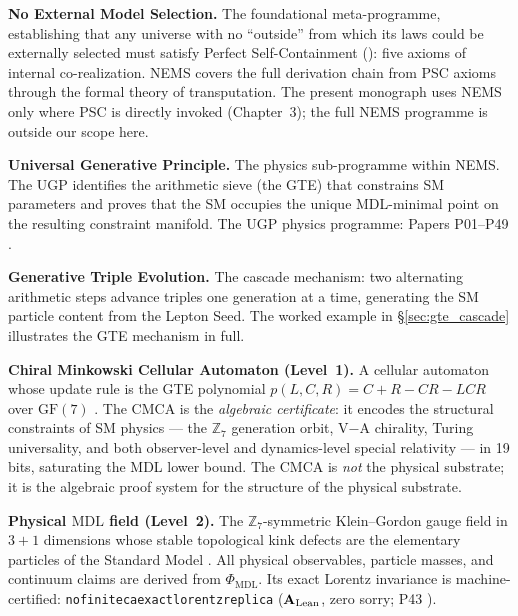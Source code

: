 \documentclass[11pt,openany]{book}
\theoremstyle{remark}
\newcommand{\UGP}{\text{UGP}}
\newcommand{\GTE}{\text{GTE}}
\newcommand{\MDL}{\text{MDL}}
\newcommand{\PSC}{\text{PSC}}
\newcommand{\NEMS}{\text{NEMS}}
\newcommand{\PHIMDL}{\Phi_{\mathrm{MDL}}}
\newcommand{\lean}[1]{%
  \penalty-100
  \begingroup\def\_{\textunderscore\allowbreak}\texttt{#1}\endgroup}
\newcommand{\CMCA}{\text{CMCA}}
\newcommand{\poly}{p(L,C,R)}
\newcommand{\CatAL}{\ensuremath{\textbf{A}_{\rm Lean}}}
\begin{document}
\begin{description}[leftmargin=2.4cm,labelwidth=2.2cm,itemsep=8pt]
\item[\NEMS] \textbf{No External Model Selection.}
  The foundational meta-programme, establishing that any universe with no ``outside''
  from which its laws could be externally selected must satisfy Perfect Self-Containment
  (\PSC): five axioms of internal co-realization.
  NEMS covers the full derivation chain from PSC axioms through the formal theory of
  transputation.
  The present monograph uses NEMS only where PSC is directly invoked
  (Chapter~3); the full NEMS programme is outside our scope here.

\item[\UGP] \textbf{Universal Generative Principle.}
  The physics sub-programme within NEMS.
  The UGP identifies the arithmetic sieve (the GTE) that constrains SM parameters
  and proves that the SM occupies the unique MDL-minimal point on the resulting
  constraint manifold.
  The UGP physics programme: Papers P01--P49 \cite{SpivackUGPSurvey}.

\item[\GTE] \textbf{Generative Triple Evolution.}
  The cascade mechanism: two alternating arithmetic steps advance triples one
  generation at a time, generating the SM particle content from the Lepton Seed.
  The worked example in \S\ref{sec:gte_cascade} illustrates the GTE mechanism in full.

\item[\CMCA] \textbf{Chiral Minkowski Cellular Automaton (Level~1).}
  A cellular automaton whose update rule is the GTE polynomial
  $\poly = C + R - CR - LCR$ over $\mathrm{GF}(7)$
  \cite{SpivackCMCA}.
  The CMCA is the \emph{algebraic certificate}: it encodes the structural constraints
  of SM physics --- the $\mathbb{Z}_7$ generation orbit, V$-$A chirality, Turing
  universality, and both observer-level and dynamics-level special relativity ---
  in 19 bits, saturating the MDL lower bound.
  The CMCA is \emph{not} the physical substrate; it is the algebraic proof
  system for the structure of the physical substrate.

\item[$\PHIMDL$] \textbf{Physical $\MDL$ field (Level~2).}
  The $\mathbb{Z}_7$-symmetric Klein--Gordon gauge field in $3{+}1$ dimensions whose
  stable topological kink defects are the elementary particles of the Standard Model
  \cite{SpivackPhiMDLField}.
  All physical observables, particle masses, and continuum claims are derived from
  $\PHIMDL$.
  Its exact Lorentz invariance is machine-certified:
  \lean{no\_finite\_ca\_exact\_lorentz\_replica} (\CatAL, zero sorry; P43
  \cite{SpivackCompleteness}).
\end{description}
\end{document}
